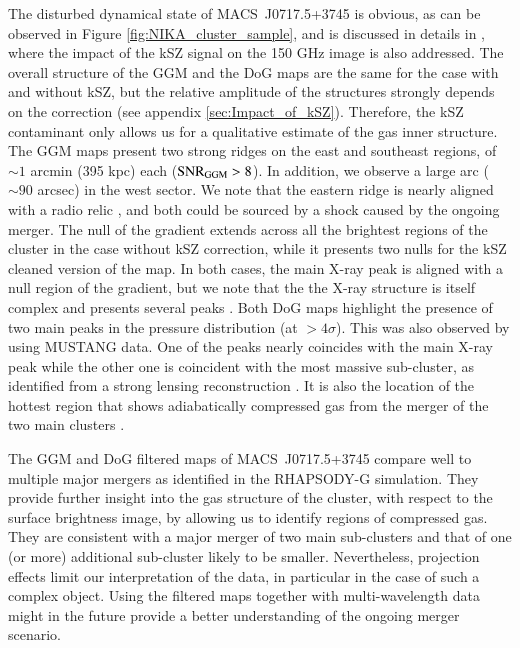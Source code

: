 \documentclass[twocolumn,traditabstract]{aa}
\begin{document}
The disturbed dynamical state of \mbox{MACS~J0717.5+3745} is obvious, as can be observed in Figure \ref{fig:NIKA_cluster_sample}, and is discussed in details in \cite{Adam2016b}, where the impact of the kSZ signal on the 150 GHz image is also addressed. The overall structure of the GGM and the DoG maps are the same for the case with and without kSZ, but the relative amplitude of the structures strongly depends on the correction (see appendix \ref{sec:Impact_of_kSZ}). Therefore, the kSZ contaminant only allows us for a qualitative estimate of the gas inner structure. The GGM maps present two strong ridges on the east and southeast regions, of $\sim 1$ arcmin (395 kpc) each (${\rm SNR}_{\rm GGM} > 8$). In addition, we observe a large arc ($\sim 90$ arcsec) in the west sector. We note that the eastern ridge is nearly aligned with a radio relic \citep[see, e.g.][]{vanWeeren2017}, and both could be sourced by a shock caused by the ongoing merger. The null of the gradient extends across all the brightest regions of the cluster in the case without kSZ correction, while it presents two nulls for the kSZ cleaned version of the map. In both cases, the main X-ray peak is aligned with a null region of the gradient, but we note that the the X-ray structure is itself complex and presents several peaks \citep[e.g.][]{Ma2009}. Both DoG maps highlight the presence of two main peaks in the pressure distribution (at $> 4 \sigma$). This was also observed by \cite{Mroczkowski2012} using MUSTANG data. One of the peaks nearly coincides with the main X-ray peak while the other one is coincident with the most massive sub-cluster, as identified from a strong lensing reconstruction \citep[e.g.][]{Limousin2015}. It is also the location of the hottest region that shows adiabatically compressed gas from the merger of the two main clusters \citep[see][]{Adam2016b}.

The GGM and DoG filtered maps of \mbox{MACS~J0717.5+3745} compare well to multiple major mergers as identified in the RHAPSODY-G simulation. They provide further insight into the gas structure of the cluster, with respect to the surface brightness image, by allowing us to identify regions of compressed gas. They are consistent with a major merger of two main sub-clusters and that of one (or more) additional sub-cluster likely to be smaller. Nevertheless, projection effects limit our interpretation of the data, in particular in the case of such a complex object. Using the filtered maps together with multi-wavelength data might in the future provide a better understanding of the ongoing merger scenario.
\end{document}
